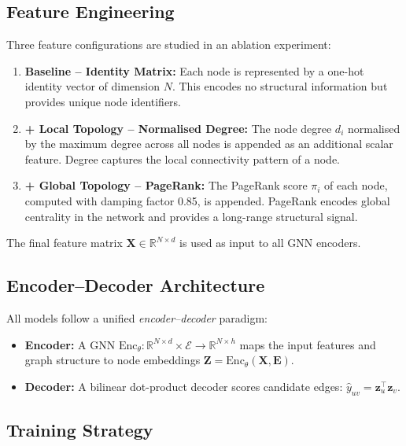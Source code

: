 \documentclass[12pt,a4paper]{article}
\begin{document}
\subsection{Feature Engineering}
\label{sec:features}

Three feature configurations are studied in an ablation experiment:

\begin{enumerate}
    \item \textbf{Baseline -- Identity Matrix:} Each node is represented by a one-hot identity vector of dimension $N$. This encodes no structural information but provides unique node identifiers.
    \item \textbf{+ Local Topology -- Normalised Degree:} The node degree $d_i$ normalised by the maximum degree across all nodes is appended as an additional scalar feature. Degree captures the local connectivity pattern of a node.
    \item \textbf{+ Global Topology -- PageRank:} The PageRank score $\pi_i$ of each node, computed with damping factor 0.85, is appended. PageRank encodes global centrality in the network and provides a long-range structural signal.
\end{enumerate}

The final feature matrix $\mathbf{X} \in \mathbb{R}^{N \times d}$ is used as input to all GNN encoders.

\subsection{Encoder--Decoder Architecture}

All models follow a unified \textit{encoder--decoder} paradigm:

\begin{itemize}
    \item \textbf{Encoder:} A GNN $\text{Enc}_\theta: \mathbb{R}^{N \times d} \times \mathcal{E} \to \mathbb{R}^{N \times h}$ maps the input features and graph structure to node embeddings $\mathbf{Z} = \text{Enc}_\theta(\mathbf{X}, \mathbf{E})$.
    \item \textbf{Decoder:} A bilinear dot-product decoder scores candidate edges: $\hat{y}_{uv} = \mathbf{z}_u^\top \mathbf{z}_v$.
\end{itemize}

\subsection{Training Strategy}
\end{document}
